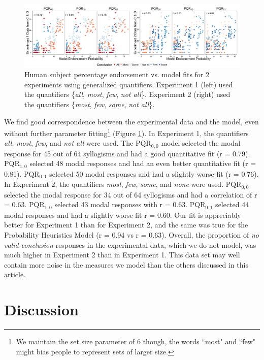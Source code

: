 \documentclass[10pt,letterpaper]{article}
\begin{document}
\begin{figure}[t]
	\centering
  \includegraphics[width=\textwidth]{fig3_multiScatter_colorset_AMFO_MFIE_n6_alpha2}
      \caption{Human subject percentage endorsement vs. model fits for 2 experiments using generalized quantifiers. Experiment 1 (left) used the quantifiers \{\emph{all}, \emph{most}, \emph{few}, \emph{not all}\}. Experiment 2 (right) used the quantifiers \{\emph{most}, \emph{few}, \emph{some}, \emph{not all}\}.}
  \label{fig:mfScatter}
\end{figure}


We find good correspondence between the experimental data and the model, even without further parameter fitting\footnote{We maintain the set size parameter of 6 though, the words ``most" and ``few" might bias people to represent sets of larger size.} (Figure \ref{fig:mfScatter}). In Experiment 1, the quantifiers \emph{all}, \emph{most}, \emph{few}, and \emph{not all} were used. The PQR$_{0,0}$ model selected the modal response for 45 out of 64 syllogisms and had a good quantitative fit (r = 0.79).  PQR$_{1,0}$ selected 48 modal responses and had an even better quantitative fit (r = 0.81). PQR$_{0,1}$ selected 50 modal responses and had a slightly worse fit (r = 0.76). 
%
In Experiment 2, the quantifiers \emph{most}, \emph{few}, \emph{some}, and \emph{none} were used. PQR$_{0,0}$ selected the modal response for 34 out of 64 syllogisms and had a correlation of r = 0.63. PQR$_{1,0}$ selected 43 modal responses with  r = 0.63. PQR$_{0,1}$ selected 44 modal responses and had a slightly worse fit r = 0.60. 
%
Our fit is appreciably better for Experiment 1 than for Experiment 2, and the same was true for the Probability Heuristics Model (r = 0.94 vs r = 0.63). Overall, the proportion of \emph{no valid conclusion} responses in the experimental data, which we do not model, was much higher in Experiment 2 than in Experiment 1. This data set may well contain more noise in the measures we model than the others discussed in this article. 


\section{Discussion}
\end{document}
